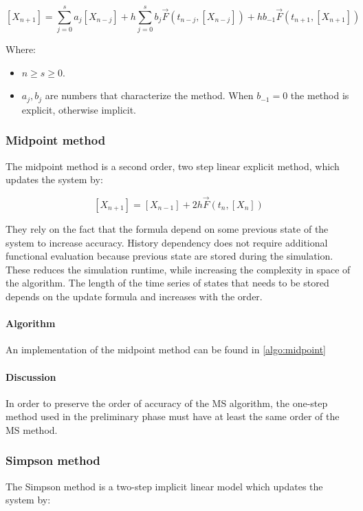   $$[X_{n+1}] = \sum\limits_{j=0}^sa_j[X_{n-j}] + h\sum\limits_{j=0}^sb_j\vec{F}(t_{n-j}, [X_{n-j}]) + hb_{-1}\vec{F}(t_{n+1}, [X_{n+1}])$$

  Where:

  \begin{multicols}{2}
    \begin{itemize}
      \item $n\ge s\ge 0$.
      \item $a_j, b_j$ are numbers that characterize the method.
        When $b_{-1}= 0$ the method is explicit, otherwise implicit.
    \end{itemize}
  \end{multicols}

    \subsubsection{Midpoint method}
    The midpoint method is a second order, two step linear explicit method, which updates the system by:

    $$[X_{n+1}] = [X_{n-1}] + 2h\vec{F}(t_n, [X_n])$$

    They rely on the fact that the formula depend on some previous state of the system to increase accuracy.
    History dependency does not require additional functional evaluation because previous state are stored during the simulation.
    These reduces the simulation runtime, while increasing the complexity in space of the algorithm.
    The length of the time series of states that needs to be stored  depends on the update formula and increases with the order.

      \paragraph{Algorithm}
      An implementation of the midpoint method can be found in \ref{algo:midpoint}

      

      \paragraph{Discussion}
      In order to preserve the order of accuracy of the MS algorithm, the one-step method used in the preliminary phase must have at least the same order of the MS method.

    \subsubsection{Simpson method}
    The Simpson method is a two-step implicit linear model which updates the system by:

